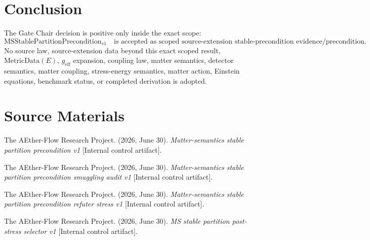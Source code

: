 \documentclass[11pt]{article}
\newcommand{\MSStablePre}{\mathrm{MSStablePartitionPrecondition}_{v1}}
\newcommand{\MetricData}{\mathrm{MetricData}}
\newcommand{\geff}{g_{\mathrm{eff}}}
\begin{document}
\section{Conclusion}

The Gate Chair decision is positive only inside the exact scope:
\[
\MSStablePre
\quad\text{is accepted as scoped source-extension stable-precondition evidence/precondition.}
\]
No source law, source-extension data beyond this exact scoped result,
\(\MetricData(E)\), \(\geff\) expansion, coupling law, matter semantics,
detector semantics, matter coupling, stress-energy semantics, matter action,
Einstein equations, benchmark status, or completed derivation is adopted.

\section{Source Materials}

The AEther-Flow Research Project. (2026, June 30). \emph{Matter-semantics
stable partition precondition v1} [Internal control artifact].

The AEther-Flow Research Project. (2026, June 30). \emph{Matter-semantics
stable partition precondition smuggling audit v1} [Internal control
artifact].

The AEther-Flow Research Project. (2026, June 30). \emph{Matter-semantics
stable partition precondition refuter stress v1} [Internal control artifact].

The AEther-Flow Research Project. (2026, June 30). \emph{MS stable partition
post-stress selector v1} [Internal control artifact].
\end{document}
